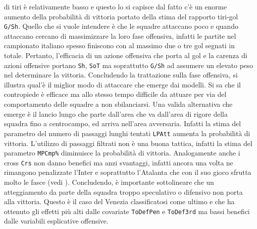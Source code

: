 di tiri è relativamente basso e questo lo si capisce dal fatto c'è un enorme aumento della probabilità di vittoria portato della stima del rapporto tiri-gol \texttt{G/Sh}. Quello che si vuole intendere è che le squadre attaccano poco e quando attaccano cercano di massimizzare la loro fase offensiva, infatti le partite nel campionato italiano spesso finiscono con al massimo due o tre gol segnati in totale. Pertanto, l'efficacia di un azione offensiva che porta al gol e la carenza di azioni offensive portano \texttt{Sh}, \texttt{SoT} ma soprattutto \texttt{G/Sh} ad assumere un elevato peso nel determinare la vittoria. Concludendo la trattazione sulla fase offensiva, si illustra qual'è il miglior modo di attaccare che emerge dai modelli. Si sa che il contropiede è efficace ma allo stesso tempo difficile da attuare per via del comportamento delle squadre a non sbilanciarsi. Una valida alternativa che emerge è il lancio lungo che parte dall'area che va dall'area di rigore della squadra fino a centrocampo, ed arriva nell'area avversaria. Infatti la stima del parametro del numero di passaggi lunghi tentati \texttt{LPAtt} aumenta la probabilità di vittoria. L'utilizzo di passaggi filtrati non è una buona tattica, infatti la stima del parametro \texttt{MPCmp\%} diminuisce la probabilità di vittoria. Analogamente anche i cross \texttt{Crs} non danno benefici ma anzi svantaggi, infatti ancora una volta ne rimangono penalizzate l'Inter e soprattutto l'Atalanta che con il suo gioco sfrutta molto le fasce (vedi \textit{\cite{site:ataGioco}}). Concludendo, è importante sottolineare che un atteggiamento da parte della squadra troppo speculativo o difensivo non porta alla vittoria. Questo è il caso del Venezia classificatosi come ultimo e che ha ottenuto gli effetti più alti dalle covariate \texttt{ToDefPen} e \texttt{ToDef3rd} ma bassi benefici dalle variabili esplicative offensive.

